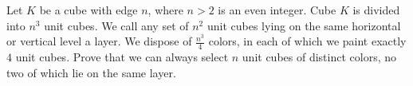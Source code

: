Let $K$ be a cube with edge $n$, where $n>2$ is an even integer. Cube $K$ is divided into $n^3$ unit cubes. We call any set of $n^2$ unit cubes lying on the same horizontal or vertical level a layer. We dispose of $\frac{n^3}4$ colors, in each of which we paint exactly $4$ unit cubes. Prove that we can always select $n$ unit cubes of distinct colors, no two of which lie on the same layer.